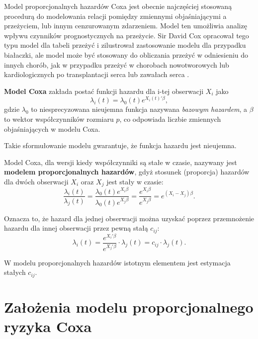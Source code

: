 Model proporcjonalnych hazardów Coxa \cite{cox} jest obecnie najczęściej stosowaną procedurą do modelowania relacji pomiędzy zmiennymi objaśniającymi a przeżyciem, lub innym cenzurowanym zdarzeniem. Model ten umożliwia analizę wpływu czynników prognostycznych na przeżycie. Sir David Cox opracował tego typu model dla tabeli przeżyć i zilustrował zastosowanie modelu dla przypadku
białaczki, ale model może być stosowany do obliczania
przeżyć w odniesieniu do innych chorób, jak
w przypadku przeżyć w chorobach nowotworowych lub
kardiologicznych po transplantacji serca lub zawałach
serca \cite{norwe}. 

\begin{definition}\label{defi:koksik}
\textbf{Model Coxa} zakłada postać funkcji hazardu dla i-tej obserwacji $X_i$ jako
\begin{equation}\label{eq:haz}
\lambda_i(t) = \lambda_0(t)e^{X_i(t)'\beta},
\end{equation}
gdzie $\lambda_0$ to niesprecyzowana nieujemna funkcja nazywana \textit{bazowym hazardem}, a $\beta$ to wektor współczynników rozmiaru $p$, co odpowiada liczbie zmiennych objaśniających w modelu Coxa.
\end{definition}

Takie sformułowanie modelu gwarantuje, że funkcja hazardu jest nieujemna. 


Model Coxa, dla wersji kiedy współczynniki są stałe w czasie, nazywany jest \textbf{modelem proporcjonalnych hazardów}, gdyż stosunek (proporcja) hazardów dla dwóch obserwacji $X_i$ oraz $X_j$ jest stały w czasie:  
$$\dfrac{\lambda_i(t)}{\lambda_j(t)} = \dfrac{\lambda_0(t)e^{X_i\beta}}{\lambda_0(t)e^{X_j\beta}} = \dfrac{e^{X_i\beta}}{e^{X_j\beta}} = e^{(X_i-X_j)\beta}.$$

Oznacza to, że hazard dla jednej obserwacji można uzyskać poprzez przemnożenie hazardu dla innej obserwacji przez pewną stałą $c_{ij}$:
$$\lambda_i(t) = \dfrac{e^{X_i'\beta}}{e^{X_j'\beta}} \cdot \lambda_j(t) = c_{ij} \cdot \lambda_j(t).$$

W modelu proporcjonalnych hazardów istotnym elementem jest estymacja stałych $c_{ij}$.

\section{Założenia modelu proporcjonalnego ryzyka Coxa}

